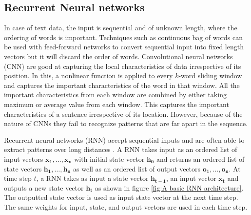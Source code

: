 \documentclass[a4paper, 11pt]{article}
\begin{document}
\subsection{Recurrent Neural networks}


In case of text data, the input is sequential and of unknown length, where the ordering of words is important. Techniques such as continuous bag of words \parencite{DBLP:journals/corr/abs-1301-3781} can be used with feed-forward networks to convert sequential input into fixed length vectors but it will discard the order of words. Convolutional neural networks (CNN) \parencite{Bengio1997} are good at capturing the local characteristics of data irrespective of its position. In this, a nonlinear function is applied to every $k$-word sliding window and captures the important characteristics of the word in that window. All the important characteristics from each window are combined by either taking maximum or average value from each window. This captures the important characteristics of a sentence irrespective of its location. However, because of the nature of CNNs they fail to recognize patterns that are far apart in the sequence.

Recurrent neural networks (RNN) accept sequential inputs and are often able to extract patterns over long distances \parencite{Elman}. A RNN takes input as an ordered list of input vectors $\mathrm{\mathbf{x_1},\dots,\mathbf{x_n}}$ with initial state vector $\mathbf{h_0}$ and returns an ordered list of state vectors $\mathrm{\mathbf{h_1},\dots,\mathbf{h_n}}$ as well as an ordered list of output vectors $\mathrm{\mathbf{o_1},\dots,\mathbf{o_n}}$. At time step $t$, a RNN takes as input a state vector $\mathbf{h_{t-1}}$, an input vector $\mathbf{x_{t}}$ and outputs a new state vector $\mathbf{h_{t}}$ as shown in figure \ref{fig:A basic RNN architecture}. The outputted state vector is used as input state vector at the next time step. The same weights for input, state, and output vectors are used in each time step.  

\end{document}
